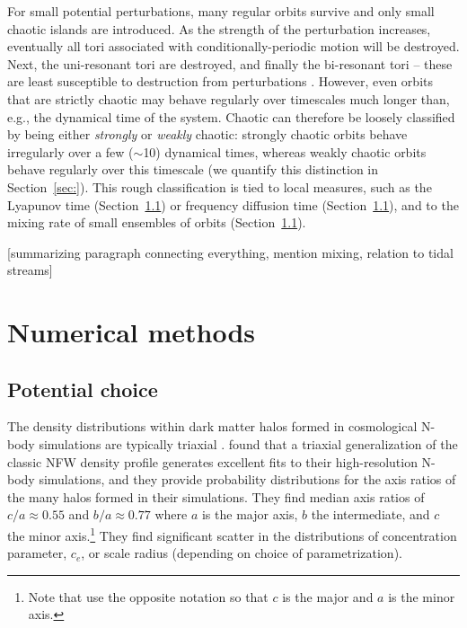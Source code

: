 \documentclass[letterpaper,12pt,preprint]{aastex}
\begin{document}
For small potential perturbations, many regular orbits survive and only small chaotic islands are introduced. As the strength of the perturbation increases, eventually all tori associated with conditionally-periodic motion will be destroyed. Next, the uni-resonant tori are destroyed, and finally the bi-resonant tori -- these are least susceptible to destruction from perturbations \citep[e.g., see][]{valluri98}. However, even orbits that are strictly chaotic may behave regularly over timescales much longer than, e.g., the dynamical time of the system. Chaotic can therefore be loosely classified by being either \emph{strongly} or \emph{weakly} chaotic: strongly chaotic orbits behave irregularly over a few ($\sim$10) dynamical times, whereas weakly chaotic orbits behave regularly over this timescale (we quantify this distinction in Section~\ref{sec:}). This rough classification is tied to local measures, such as the Lyapunov time (Section~\ref{}) or frequency diffusion time (Section~\ref{}), and to the mixing rate of small ensembles of orbits (Section~\ref{}).

[summarizing paragraph connecting everything, mention mixing, relation to tidal streams]

\section{Numerical methods}

\subsection{Potential choice}

The density distributions within dark matter halos formed in cosmological N-body simulations are typically triaxial \citep[e.g.,][]{jing02, bett07, zemp09, veraciro11}. \citet{jing02} found that a triaxial generalization of the classic NFW density profile \citep{navarro96} generates excellent fits to their high-resolution N-body simulations, and they provide probability distributions for the axis ratios of the many halos formed in their simulations. They find median axis ratios of $c/a \approx 0.55$ and $b/a \approx 0.77$ where $a$ is the major axis, $b$ the intermediate, and $c$ the minor axis.\footnote{Note that \citet{jing02} use the opposite notation so that $c$ is the major and $a$ is the minor axis.} They find significant scatter in the distributions of concentration parameter, $c_e$, or scale radius (depending on choice of parametrization). 
\end{document}
